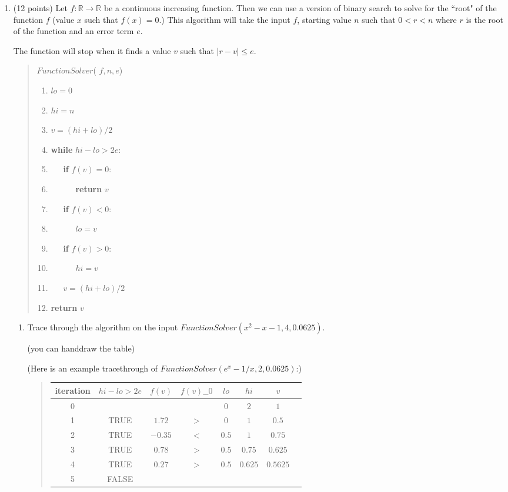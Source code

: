 \documentclass[10pt,letterpaper,unboxed,cm]{article}
\begin{document}
\begin{enumerate}



\item (12 points)
Let $f:\mathbb{R}\to \mathbb{R}$ be a continuous increasing function. Then we can use a version of binary search to solve for the ``root" of the function $f$ (value $x$ such that $f(x)=0$.) This algorithm will take the input $f$, starting value $n$ such that $0< r< n$ where $r$ is the root of the function and an error term $e$.

The function will stop when it finds a value $v$ such that $|r-v|\leq e$.



\begin{quote}
\noindent $FunctionSolver$( $f,n,e$)
\begin{enumerate}[1.]
\item $lo = 0$
\item $hi = n$
\item $v=(hi+lo)/2$
\item {\bf while} $hi-lo> 2e$:
\item ~~~{\bf if} $f(v)=0$:
\item ~~~~~~{\bf return} $v$
\item ~~~{\bf if} $f(v)<0$:
\item ~~~~~~$lo = v$
\item ~~~{\bf if} $f(v)>0$:
\item ~~~~~~$hi = v$
\item ~~~$v=(hi+lo)/2$
\item {\bf return} $v$
\end{enumerate}
\end{quote}


\begin{enumerate}

\item
Trace through the algorithm on the input $FunctionSolver(x^2-x-1,4,0.0625)$.

(you can handdraw the table)

(Here is an example tracethrough of $FunctionSolver(e^x-1/x,2,0.0625)$:)

\begin{quote}

\begin{tabular}{|c|c|c|c|c|c|c|c|}
iteration&$hi-lo>2e$&$f(v)$&$f(v)\_\_0$&$lo$&$hi$&$v$\\
\hline
0&&&&$0$&$2$&$1$\\
\hline
1&TRUE&$1.72$&$>$&$0$&$1$&$0.5$\\
\hline
2&TRUE&$-0.35$&$<$&$0.5$&$1$&$0.75$\\
\hline
3&TRUE&$0.78$&$>$&$0.5$&$0.75$&$0.625$\\
\hline
4&TRUE&$0.27$&$>$&$0.5$&$0.625$&$0.5625$\\
\hline
5&FALSE&&&&&\\
\end{tabular}


\end{quote}
\end{enumerate}
\end{enumerate}
\end{document}
